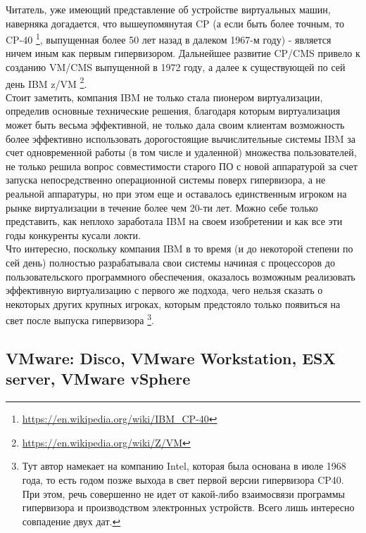 \documentclass[14pt, a4paper]{article}
\begin{document}
Читатель, уже имеющий представление об устройстве виртуальных машин, наверняка
догадается, что вышеупомянутая CP (а если быть более точным, то CP-40 \footnote{\href{https://en.wikipedia.org/wiki/IBM_CP-40}{https://en.wikipedia.org/wiki/IBM\_CP-40}},
выпущенная более 50 лет назад в далеком 1967-м году) - является ничем иным как
первым гипервизором. Дальнейшее развитие CP/CMS привело к созданию VM/CMS
выпущенной в 1972 году, а далее к существующей по сей день IBM z/VM \footnote{\href{https://en.wikipedia.org/wiki/Z/VM}{https://en.wikipedia.org/wiki/Z/VM}}.\\

Стоит заметить, компания IBM не только стала пионером виртуализации, определив
основные технические решения, благодаря которым виртуализация может быть весьма
эффективной, не только дала своим клиентам возможность более эффективно
использовать дорогостоящие вычислительные системы IBM за счет одновременной
работы (в том числе и удаленной) множества пользователей, не только решила вопрос
совместимости старого ПО с новой аппаратурой за счет запуска непосредственно
операционной системы поверх гипервизора, а не реальной аппаратуры, но при этом
еще и оставалось единственным игроком на рынке виртуализации в течение более
чем 20-ти лет. Можно себе только представить, как неплохо заработала IBM на своем
изобретении и как все эти годы конкуренты кусали локти.\\

Что интересно, поскольку компания IBM в то время (и до некоторой степени по сей
день) полностью разрабатывала свои системы начиная с процессоров до
пользовательского программного обеспечения, оказалось возможным реализовать
эффективную виртуализацию с первого же подхода, чего нельзя сказать о некоторых 
других крупных игроках, которым предстояло только появиться на свет после выпуска
гипервизора \footnote{Тут автор намекает на компанию Intel, которая была основана в июле 1968 года, то есть годом
позже выхода в свет первой версии гипервизора CP40. При этом, речь совершенно не идет от
какой-либо взаимосвязи программы гипервизора и производством электронных устройств.
Всего лишь интересно совпадение двух дат.}.

\subsection*{VMware: Disco, VMware Workstation, ESX server, VMware
vSphere}
\end{document}
